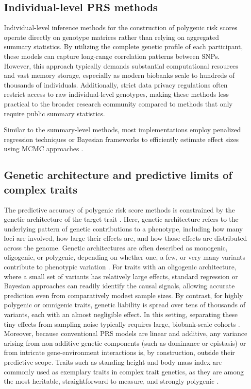\subsection{Individual-level PRS methods}

Individual-level inference methods for the construction of polygenic risk scores operate directly on genotype matrices rather than relying on aggregated summary statistics. By utilizing the complete genetic profile of each participant, these models can capture long-range correlation patterns between SNPs. However, this approach typically demands substantial computational resources and vast memory storage, especially as modern biobanks scale to hundreds of thousands of individuals. Additionally, strict data privacy regulations often restrict access to raw individual-level genotypes, making these methods less practical to the broader research community compared to methods that only require public summary statistics. 

Similar to the summary-level methods, most implementations employ penalized regression techniques \cite{snpnet2020,regenie} or Bayesian frameworks to efficiently estimate effect sizes using MCMC approaches \cite{BayesAB2010, BayesC2011, BayesRR2013, BayesR2015, Orliac2022}.

\subsection{Genetic architecture and predictive limits of complex traits}

The predictive accuracy of polygenic risk score methods is constrained by the genetic architecture of the target trait \cite{Chatterjee}. Here, genetic architecture refers to the underlying pattern of genetic contributions to a phenotype, including how many loci are involved, how large their effects are, and how those effects are distributed across the genome. Genetic architectures are often described as monogenic, oligogenic, or polygenic, depending on whether one, a few, or very many variants contribute to phenotypic variation \cite{genetic_architecture}. For traits with an oligogenic architecture, where a small set of variants has relatively large effects, standard regression or Bayesian approaches can readily identify the causal signals, allowing accurate prediction even from comparatively modest sample sizes. By contrast, for highly polygenic or omnigenic traits, genetic liability is spread over tens of thousands of variants, each with an almost negligible effect. In this setting, separating these tiny effects from sampling noise typically requires large, biobank-scale cohorts \cite{Chatterjee}. Moreover, because conventional PRS models are linear and additive, any variance arising from non-additive genetic components (such as dominance or epistasis) or from intricate gene-environment interactions is, by construction, outside their predictive scope. Traits such as standing height and body mass index are commonly used as exemplary traits in complex trait genetics, as they are among the most heritable, straightforward to measure, and strongly polygenic \cite{HTbig}.

